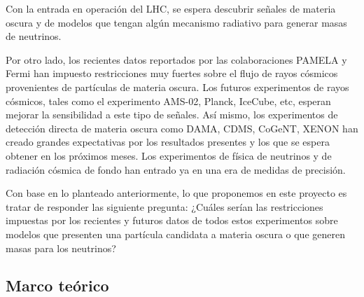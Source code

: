  



Con la entrada en operación del LHC, se espera descubrir señales de materia oscura y de modelos que tengan algún mecanismo radiativo para generar masas de neutrinos.

Por otro lado, los recientes datos reportados por las colaboraciones PAMELA y Fermi han impuesto restricciones muy fuertes sobre el flujo de rayos cósmicos provenientes de partículas de materia oscura. Los futuros experimentos de rayos cósmicos, tales como el experimento AMS-02, Planck, IceCube, etc, esperan mejorar la sensibilidad a este tipo de señales. Así mismo, los experimentos de detección directa de materia oscura como DAMA, CDMS, CoGeNT, XENON han creado grandes expectativas por los resultados presentes y los que se espera obtener en los próximos meses. Los experimentos de física de neutrinos y de radiación cósmica de fondo han entrado ya en una era de medidas de precisión.

Con base en lo planteado anteriormente, lo que proponemos en este proyecto es tratar de responder las siguiente pregunta: ¿Cuáles serían las restricciones impuestas por los recientes y futuros datos de todos estos experimentos sobre  modelos que presenten una partícula candidata a materia oscura o que generen masas para los neutrinos?


\subsection{Marco teórico}


